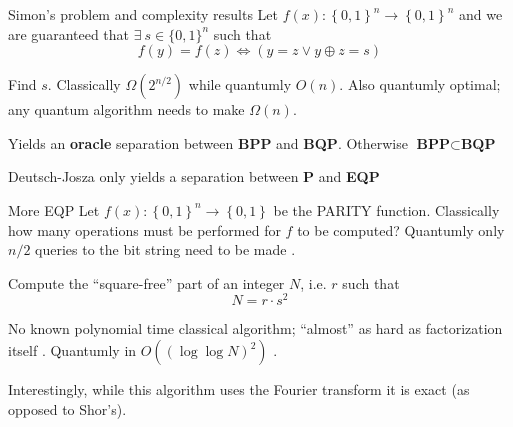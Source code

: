 \documentclass{beamer}
\begin{document}
\begin{frame}{Simon's problem and complexity results}
Let $f\left(x\right):\left\{ 0,1\right\} ^{n}\to\left\{ 0,1\right\}^n$ and we are guaranteed that $\exists ~ s\in \{0,1\}^n$ such that 
\[
  f\left(y\right)=f\left(z\right) \iff \left(y=z \vee y\oplus z = s\right)
\]

Find $s$. Classically $\Omega\left(2^{n/2}\right)$ while quantumly $O\left(n\right)$. Also quantumly optimal; any quantum algorithm
needs to make $\Omega\left(n\right)$. 

\vspace{\baselineskip}

Yields an \textbf{oracle} separation between \textbf{BPP} and \textbf{BQP}. Otherwise $\textbf{BPP}\subset \textbf{BQP}$

\vspace{\baselineskip}



Deutsch-Josza only yields a separation between \textbf{P} and \textbf{EQP}

\end{frame}
\begin{frame}{More EQP}
Let $f\left(x\right):\left\{ 0,1\right\} ^{n}\to\left\{ 0,1\right\}$ be the PARITY function. Classically how many operations must be performed for $f$ to be computed?
Quantumly only $n/2$ queries to the bit string need to be made \cite{de2002quantum}.  

\vspace{\baselineskip}

Compute the ``square-free'' part of an integer $N$, i.e. $r$ such that
\[
N=r\cdot s^2
\]

No known polynomial time classical algorithm; ``almost'' as hard as factorization itself \cite{Okamoto98anew}. Quantumly in $O\left(\left(\log \log N\right)^2\right)$ \cite{li2012efficient}. 

\vspace{\baselineskip}


Interestingly, while this algorithm uses the Fourier transform it is exact (as opposed to Shor's).

\end{frame}
\end{document}
